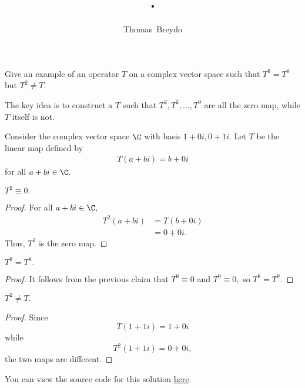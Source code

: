 \documentclass{amsart}
\title{\pagenum.\probnum}
\author{Thomas\ Breydo}
\newcommand{\pagenum}{223}
\newcommand{\probnum}{8}
\begin{document}
\maketitle

\begin{problem*}
Give an example of an operator $T$ on a complex
vector space such that $T^9=T^8$ but $T^2\ne T.$
\end{problem*}

\vspace{0.5in}

The key idea is to construct a $T$ such that $T^2,T^3,\dots,T^9$
are all the zero map, while $T$ itself is not.

Consider the complex vector space $\C$ with basis $1+0i,0+1i.$
Let $T$ be the linear map defined by
\begin{align*}
    T(a+bi)=b+0i
\end{align*}
for all $a+bi\in\C.$

\begin{claim*}
$T^2\equiv 0.$
\end{claim*}
\begin{proof}
For all $a+bi\in\C,$
\begin{align*}
    T^2(a+bi) &= T(b+0i)\\
              &= 0+0i.
\end{align*}
Thus, $T^2$ is the zero map. \end{proof}

\begin{claim*}
$T^9=T^8.$
\end{claim*}
\begin{proof}
It follows from the previous claim that $T^8\equiv 0$ and $T^9\equiv 0,$
so $T^8=T^9.$
\end{proof}

\begin{claim*}
$T^2\ne T.$
\end{claim*}
\begin{proof}
Since $$T(1+1i)=1+0i$$ while $$T^2(1+1i)=0+0i,$$ the two maps
are different.
\end{proof}
\vspace{0.5in}

\begin{note*}
You can view the source code for this solution
\href{https://github.com/thomasbreydo/linalg/blob/main/\pagenum_\probnum_Thomas_Breydo.tex}
{here}.
\end{note*}
\end{document}
